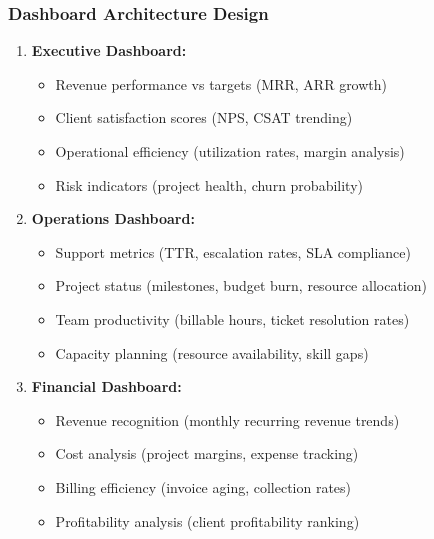 \subsubsection{Dashboard Architecture Design}
\begin{enumerate}
\item \textbf{Executive Dashboard:}
  \begin{itemize}
    \item Revenue performance vs targets (MRR, ARR growth)
    \item Client satisfaction scores (NPS, CSAT trending)
    \item Operational efficiency (utilization rates, margin analysis)
    \item Risk indicators (project health, churn probability)
  \end{itemize}

\item \textbf{Operations Dashboard:}
  \begin{itemize}
    \item Support metrics (TTR, escalation rates, SLA compliance)
    \item Project status (milestones, budget burn, resource allocation)
    \item Team productivity (billable hours, ticket resolution rates)
    \item Capacity planning (resource availability, skill gaps)
  \end{itemize}

\item \textbf{Financial Dashboard:}
  \begin{itemize}
    \item Revenue recognition (monthly recurring revenue trends)
    \item Cost analysis (project margins, expense tracking)
    \item Billing efficiency (invoice aging, collection rates)
    \item Profitability analysis (client profitability ranking)
  \end{itemize}
\end{enumerate}

